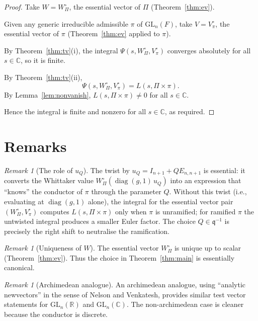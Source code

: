 \documentclass[12pt]{article}
\theoremstyle{definition}
\theoremstyle{remark}
\newtheorem{remark}[theorem]{Remark}
\DeclareMathOperator{\diag}{diag}
\begin{document}
\begin{proof}
Take $W = W^\circ_\Pi$, the essential vector of $\Pi$ (Theorem~\ref{thm:ev}).

Given any generic irreducible admissible $\pi$ of $\mathrm{GL}_n(F)$, take
$V = V^\circ_\pi$, the essential vector of $\pi$ (Theorem~\ref{thm:ev} applied
to $\pi$).

By Theorem~\ref{thm:tv}(i), the integral $\Psi(s,W^\circ_\Pi,V^\circ_\pi)$
converges absolutely for all $s\in\mathbb{C}$, so it is finite.

By Theorem~\ref{thm:tv}(ii),
\[
  \Psi(s,W^\circ_\Pi,V^\circ_\pi) = L(s,\Pi\times\pi).
\]
By Lemma~\ref{lem:nonvanish}, $L(s,\Pi\times\pi)\ne0$ for all $s\in\mathbb{C}$.

Hence the integral is finite and nonzero for all $s\in\mathbb{C}$, as required.
\end{proof}

\section{Remarks}

\begin{remark}[The role of $u_Q$]
The twist by $u_Q = I_{n+1} + QE_{n,n+1}$ is essential: it converts the
Whittaker value $W^\circ_\Pi(\diag(g,1)\,u_Q)$ into an expression that
``knows'' the conductor of $\pi$ through the parameter $Q$.  Without this
twist (i.e., evaluating at $\diag(g,1)$ alone), the integral for the essential
vector pair $(W^\circ_\Pi, V^\circ_\pi)$ computes $L(s,\Pi\times\pi)$ only
when $\pi$ is unramified; for ramified $\pi$ the untwisted integral produces
a smaller Euler factor.  The choice $Q\in\mathfrak{q}^{-1}$ is precisely the
right shift to neutralise the ramification.
\end{remark}

\begin{remark}[Uniqueness of $W$]
The essential vector $W^\circ_\Pi$ is unique up to scalar (Theorem~\ref{thm:ev}).
Thus the choice in Theorem~\ref{thm:main} is essentially canonical.
\end{remark}

\begin{remark}[Archimedean analogue]
An archimedean analogue, using ``analytic newvectors'' in the sense of Nelson
and Venkatesh, provides similar test vector statements for $\mathrm{GL}_n(\mathbb{R})$
and $\mathrm{GL}_n(\mathbb{C})$.  The non-archimedean case is cleaner because
the conductor is discrete.
\end{remark}
\end{document}
